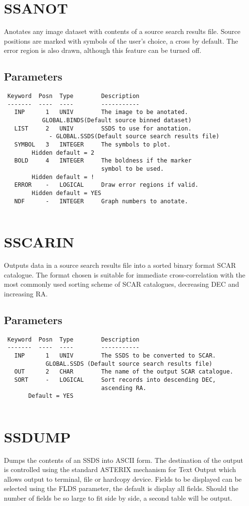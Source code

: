 \documentclass{book}
\renewcommand{\_}{{\tt\char'137}}     %
\begin{document}
\section{SSANOT}
Anotates any image dataset with contents of a source search results
file. Source positions are marked with symbols of the user's
choice, a cross by default. The error region is also drawn, although
this feature can be turned off.
 
\subsection{Parameters}
\begin{verbatim}
 Keyword  Posn  Type        Description
 -------  ----  ----        -----------
   INP      1   UNIV        The image to be anotated.
           GLOBAL.BINDS(Default source binned dataset)
   LIST     2   UNIV        SSDS to use for anotation.
             - GLOBAL.SSDS(Default source search results file)
   SYMBOL   3   INTEGER     The symbols to plot.
        Hidden default = 2
   BOLD     4   INTEGER     The boldness if the marker
                            symbol to be used.
        Hidden default = !
   ERROR    -   LOGICAL     Draw error regions if valid.
        Hidden default = YES
   NDF      -   INTEGER     Graph numbers to anotate.
 
\end{verbatim}\section{SSCARIN}
Outputs data in a source search results file into a sorted binary
format SCAR catalogue. The format chosen is suitable for immediate
cross-correlation with the most commonly used sorting scheme of
SCAR catalogues, decreasing DEC and increasing RA.
\subsection{Parameters}
\begin{verbatim}
 Keyword  Posn  Type        Description
 -------  ----  ----        -----------
   INP      1   UNIV        The SSDS to be converted to SCAR.
            GLOBAL.SSDS (Default source search results file)
   OUT      2   CHAR        The name of the output SCAR catalogue.
   SORT     -   LOGICAL     Sort records into descending DEC,
                            ascending RA.
       Default = YES
 
\end{verbatim}\section{SSDUMP}
Dumps the contents of an SSDS into ASCII form. The destination
of the output is controlled using the standard ASTERIX mechanism
for Text Output which allows output to terminal, file or
hardcopy device.
Fields to be displayed can be selected using the FLDS parameter,
the default is display all fields. Should the number of fields
be so large to fit side by side, a second table will be output.
\end{document}
